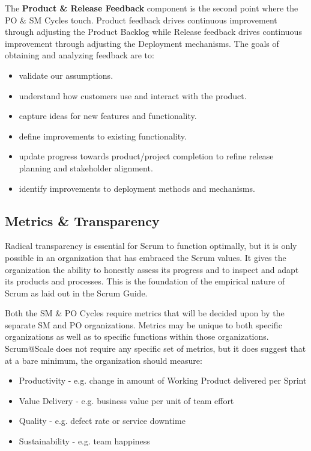 \documentclass[12pt,a4paper,parskip=full]{scrartcl}
\begin{document}
The \textbf{Product \& Release Feedback} component is the second point where the PO \& SM Cycles touch. Product feedback drives continuous improvement through adjusting the Product Backlog while Release feedback drives continuous improvement through adjusting the Deployment mechanisms. The goals of obtaining and analyzing feedback are to:

\begin{itemize}
	\item validate our assumptions.
	\item understand how customers use and interact with the product.
	\item capture ideas for new features and functionality.
	\item define improvements to existing functionality.
	\item update progress towards product/project completion to refine release planning and stakeholder alignment.
	\item identify improvements to deployment methods and mechanisms.
\end{itemize}

\subsection{Metrics \& Transparency}

Radical transparency is essential for Scrum to function optimally, but it is only possible in an organization that has embraced the Scrum values. It gives the organization the ability to honestly assess its progress and to inspect and adapt its products and processes. This is the foundation of the empirical nature of Scrum as laid out in the Scrum Guide.

Both the SM \& PO Cycles require metrics that will be decided upon by the separate SM and PO organizations. Metrics may be unique to both specific organizations as well as to specific functions within those organizations. Scrum@Scale does not require any specific set of metrics, but it does suggest that at a bare minimum, the organization should measure:

\begin{itemize}
	\item Productivity - e.g. change in amount of Working Product delivered per Sprint
	\item Value Delivery - e.g. business value per unit of team effort
	\item Quality - e.g. defect rate or service downtime
	\item Sustainability - e.g. team happiness
\end{itemize}
\end{document}
